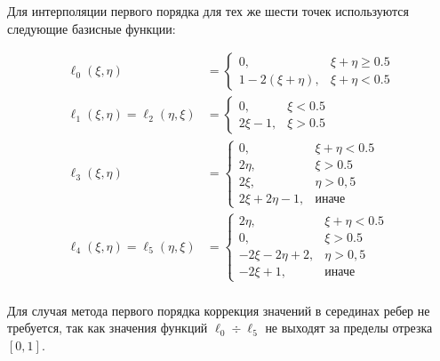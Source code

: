 Для интерполяции первого порядка для тех же шести точек используются следующие базисные функции:

\begin {equation}
\begin {aligned}
\ell_0 (\xi, \eta) &= 
\begin{cases}
0, & \xi + \eta \geqslant 0.5 \\
1-2(\xi + \eta), & \xi + \eta < 0.5
\end{cases}
 \\
\ell_1 (\xi, \eta) = \ell_2 (\eta, \xi) &= 
\begin{cases}
0, & \xi < 0.5 \\
2\xi - 1, & \xi > 0.5
\end{cases}
\\
\ell_3 (\xi, \eta) &=
\begin{cases}
0, & \xi + \eta < 0.5 \\
2\eta, & \xi > 0.5 \\
2\xi, &\eta > 0,5 \\
2\xi + 2\eta - 1, & \text{иначе}
\end{cases}
\\
\ell_4 (\xi, \eta) = \ell_5(\eta, \xi)&= 
\begin{cases}
2\eta, & \xi + \eta < 0.5 \\
0, & \xi > 0.5 \\
-2\xi -2\eta + 2, &\eta > 0,5 \\
-2\xi + 1, & \text{иначе}
\end{cases}
\\
\end {aligned}
\label{eq:piecewiselinear}
\end {equation}

Для случая метода первого порядка коррекция значений в серединах ребер не требуется, так как значения функций $\ell_0 \div \ell_5$ не выходят за пределы отрезка $[0, 1]$.